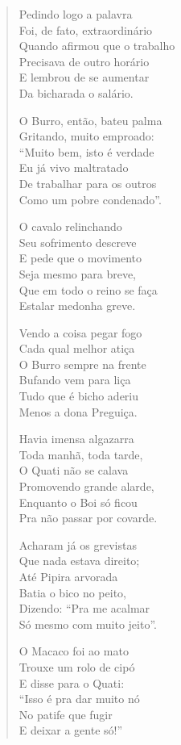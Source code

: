 \begin{verse}
Pedindo logo a palavra\\
Foi, de fato, extraordinário\\
Quando afirmou que o trabalho \\
Precisava de outro horário\\
E lembrou de se aumentar \\
Da bicharada o salário.

O Burro, então, bateu palma\\
Gritando, muito emproado:\\
“Muito bem, isto é verdade\\
Eu já vivo maltratado\\
De trabalhar para os outros\\
Como um pobre condenado”.
\pagebreak

O cavalo relinchando\\
Seu sofrimento descreve\\
E pede que o movimento\\
Seja mesmo para breve,\\
Que em todo o reino se faça\\
Estalar medonha greve.

Vendo a coisa pegar fogo\\
Cada qual melhor atiça\\
O Burro sempre na frente\\
Bufando vem para liça\\
Tudo que é bicho aderiu\\
Menos a dona Preguiça.

Havia imensa algazarra\\
Toda manhã, toda tarde,\\
O Quati não se calava\\
Promovendo grande alarde,\\
Enquanto o Boi só ficou\\
Pra não passar por covarde.

Acharam já os grevistas\\
Que nada estava direito;\\
Até Pipira arvorada\\
Batia o bico no peito,\\
Dizendo: “Pra me acalmar\\
Só mesmo com muito jeito”.
\pagebreak

O Macaco foi ao mato\\
Trouxe um rolo de cipó\\
E disse para o Quati:\\
“Isso é pra dar muito nó\\
No patife que fugir\\
E deixar a gente só!”


\end{verse}
